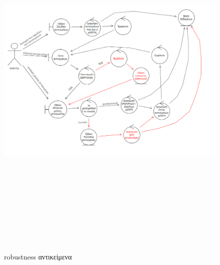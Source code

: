 \begin{figure}[!htb]
  \centering
    \centering
    \includegraphics[width=18cm,height=18cm]{robust_items.png}
    \caption{robustness αντικείμενα}
    \label{}
\end{figure}

